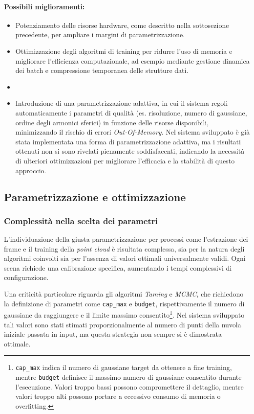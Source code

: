 \paragraph{Possibili miglioramenti:}
\begin{itemize}
	\item Potenziamento delle risorse hardware, come descritto nella sottosezione precedente, per ampliare i margini di parametrizzazione.
	\item Ottimizzazione degli algoritmi di training per ridurre l'uso di memoria e migliorare l'efficienza computazionale, ad esempio mediante gestione dinamica dei batch e compressione temporanea delle strutture dati.
	\item \item Introduzione di una parametrizzazione adattiva, in cui il sistema regoli automaticamente i parametri di qualità (es. risoluzione, numero di gaussiane, ordine degli armonici sferici) in funzione delle risorse disponibili, minimizzando il rischio di errori \emph{Out-Of-Memory}.  
	Nel sistema sviluppato è già stata implementata una forma di parametrizzazione adattiva, ma i risultati ottenuti non si sono rivelati pienamente soddisfacenti, indicando la necessità di ulteriori ottimizzazioni per migliorare l'efficacia e la stabilità di questo approccio.
	
\end{itemize}


\subsection{Parametrizzazione e ottimizzazione}
\subsubsection{Complessità nella scelta dei parametri}
L'individuazione della giusta parametrizzazione per processi come l'estrazione dei frame e il training della \emph{point cloud} è risultata complessa, sia per la natura degli algoritmi coinvolti sia per l'assenza di valori ottimali universalmente validi.  
Ogni scena richiede una calibrazione specifica, aumentando i tempi complessivi di configurazione.  

Una criticità particolare riguarda gli algoritmi \emph{Taming} e \emph{MCMC}, che richiedono la definizione di parametri come \texttt{cap\_max} e \texttt{budget}, rispettivamente il numero di gaussiane da raggiungere e il limite massimo consentito\footnote{\texttt{cap\_max} indica il numero di gaussiane target da ottenere a fine training, mentre \texttt{budget} definisce il massimo numero di gaussiane consentito durante l'esecuzione. Valori troppo bassi possono compromettere il dettaglio, mentre valori troppo alti possono portare a eccessivo consumo di memoria o overfitting.}.  
Nel sistema sviluppato tali valori sono stati stimati proporzionalmente al numero di punti della nuvola iniziale passata in input, ma questa strategia non sempre si è dimostrata ottimale.  


